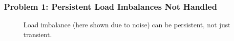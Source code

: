 \begin{frame}
\frametitle{Problem 1: Persistent Load Imbalances Not Handled}
\begin{figure}
\caption{\small Load imbalance (here shown due to noise) can be persistent, not just transient.}
\end{figure}
\end{frame}

